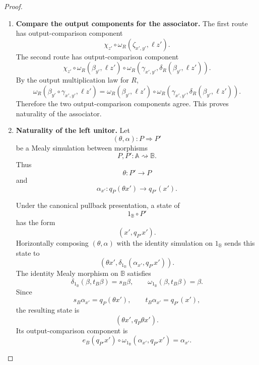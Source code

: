 \begin{proof}
\begin{enumerate}
        \item \textbf{Compare the output components for the associator.}
        The first route has output-comparison component
        \[
            \chi_{z'}\circ
            \omega_R(\zeta_{x',y'},\ell z').
        \]
        The second route has output-comparison component
        \[
            \chi_{z'}\circ
            \omega_R(\beta_{y'},\ell z')
            \circ
            \omega_R\!\left(
                \gamma_{x',y'},
                \delta_R(\beta_{y'},\ell z')
            \right).
        \]
        By the output multiplication law for \(R\),
        \[
            \omega_R(
                \beta_{y'}\circ\gamma_{x',y'},
                \ell z'
            )
            =
            \omega_R(\beta_{y'},\ell z')
            \circ
            \omega_R\!\left(
                \gamma_{x',y'},
                \delta_R(\beta_{y'},\ell z')
            \right).
        \]
        Therefore the two output-comparison components agree. This proves
        naturality of the associator.

        \item \textbf{Naturality of the left unitor.}
        Let
        \[
            (\theta,\alpha):P\Rightarrow P'
        \]
        be a Mealy simulation between morphisms
        \[
            P,P':\mathbb A\rightsquigarrow\mathbb B.
        \]
        Thus
        \[
            \theta:P'\to P
        \]
        and
        \[
            \alpha_{x'}:
            q_P(\theta x')\to q_{P'}(x').
        \]

        Under the canonical pullback presentation, a state of
        \[
            1_{\mathbb B}\circ P'
        \]
        has the form
        \[
            (x',q_{P'}x').
        \]
        Horizontally composing \((\theta,\alpha)\) with the identity simulation
        on \(1_{\mathbb B}\) sends this state to
        \[
            \left(
                \theta x',
                \delta_{1_{\mathbb B}}
                    (\alpha_{x'},q_{P'}x')
            \right).
        \]
        The identity Mealy morphism on \(\mathbb B\) satisfies
        \[
            \delta_{1_{\mathbb B}}(\beta,t_B\beta)=s_B\beta,
            \qquad
            \omega_{1_{\mathbb B}}(\beta,t_B\beta)=\beta.
        \]
        Since
        \[
            s_B\alpha_{x'}=q_P(\theta x'),
            \qquad
            t_B\alpha_{x'}=q_{P'}(x'),
        \]
        the resulting state is
        \[
            (\theta x',q_P\theta x').
        \]
        Its output-comparison component is
        \[
            e_B(q_{P'}x')
            \circ
            \omega_{1_{\mathbb B}}
                (\alpha_{x'},q_{P'}x')
            =
            \alpha_{x'}.
        \]


\end{enumerate}
\end{proof}
